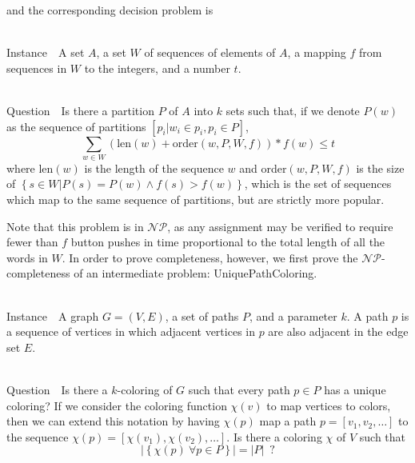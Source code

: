 \documentclass[runningheads]{llncs}
\newcommand{\NP}{\ensuremath{\mathcal{NP}}}
\newcommand{\Instance}{{\sc Instance~}}
\newcommand{\Question}{~\\
{\sc Question~}}
\begin{document}
and the corresponding decision problem is

\begin{prob}~\\
\label{minstrokesdecision}
\Instance\ A set $A$, a set $W$ of sequences of elements of $A$, a mapping $f$ from sequences in $W$ to the integers, and a number $t$.

\Question\ Is there a partition $P$ of $A$ into $k$ sets such that, if we denote $P(w)$ as the sequence of partitions $[p_i | w_i \in p_i, p_i \in P]$,
$$\sum_{w\in W} (\mathrm{len}(w)+\mathrm{order}(w,P,W,f)) * f(w) \le t$$
where len$(w)$ is the length of the sequence $w$ and order$(w,P,W,f)$ is the size of $\left\{s\in W | P(s) = P(w) \land f(s) > f(w)\right\}$, which is the set of sequences which map to the same sequence of partitions, but are strictly more popular.
\end{prob}

Note that this problem is in \NP, as any assignment may be verified to require
fewer than $f$ button pushes in time proportional to the total length of all
the words in $W$.  In order to prove completeness, however, we first prove the
\NP-completeness of an intermediate problem: {\sc UniquePathColoring}.

\begin{prob}[{\sc UniquePathColoring}]~\\
\label{upcolor}
\Instance\ A graph $G=(V,E)$, a set of paths $P$, and a parameter $k$.  A path
$p$ is a sequence of vertices in which adjacent vertices in $p$ are also
adjacent in the edge set $E$.

\Question\ Is there a $k$-coloring of $G$ such that every path $p\in P$ has a
unique coloring?  If we consider the coloring function $\chi(v)$ to map
vertices to colors, then we can extend this notation by having $\chi(p)$ map a
path $p = [ v_1, v_2, \ldots ]$ to the sequence $\chi(p) = [ \chi(v_1),
\chi(v_2), \ldots ]$.  Is there a coloring $\chi$ of $V$ such that 
    $$|\left\{ \chi(p)~\forall p \in P\right\}| = |P|\enspace ?$$
\end{prob}
\end{document}
